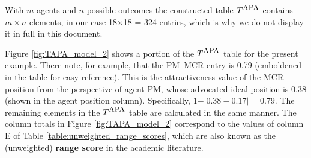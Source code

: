 \begin{enumerate}
 
With $m$ agents and $n$ possible outcomes the constructed table $T^{\mbox{\small APA}}$  contains $m\times n$ elements, in our case 18$\times$18 = 324 entries, which is why we do not display it in full in this document.



Figure \ref{fig:TAPA_model_2} shows a portion of the $T^{\mbox{\small APA}}$  table for the present example. There note, for example, that the PM--MCR entry is 0.79 (emboldened in the table for easy reference). This is the   {attractiveness} value of the MCR position  from the perspective of agent PM, whose advocated ideal position is  0.38 (shown in the agent position column). Specifically, $1-\vert 0.38 - 0.17\vert = 0.79$. The remaining elements in the $T^{\mbox{\small APA}}$ table are calculated in the same manner. The column totals in Figure \ref{fig:TAPA_model_2} correspond to the values of column E of Table \ref{table:unweighted_range_scores}, which are also known as the (unweighted) {\bf  {range score}} in the academic literature.





\end{enumerate}
